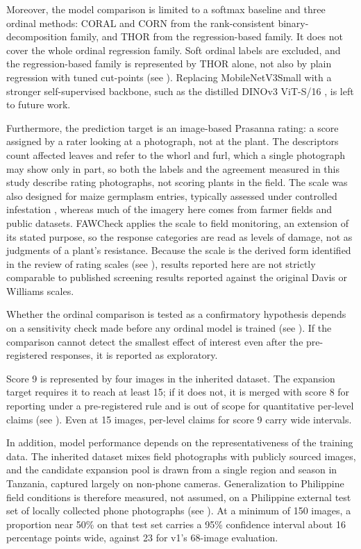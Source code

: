 \documentclass{icsthesis}
\newcommand{\secref}[1]{\textit{\nameref{#1}}}
\begin{document}
\begin{mainmatter}
				Moreover, the model comparison is limited to a softmax baseline and three ordinal
				methods: CORAL and CORN from the rank-consistent binary-decomposition family, and
				THOR from the regression-based family. It does not cover the whole ordinal
				regression family. Soft ordinal labels are excluded, and the regression-based family
				is represented by THOR alone, not also by plain regression with tuned cut-points
				(see \secref{sec:whythor}). Replacing MobileNetV3Small with a stronger self-supervised backbone, such as the distilled DINOv3 ViT-S/16 \citep{simeoni2025}, is left to future work.

				Furthermore, the prediction target is an image-based Prasanna rating: a score
				assigned by a rater looking at a photograph, not at the plant. The descriptors count
				affected leaves and refer to the whorl and furl, which a single photograph may show
				only in part, so both the labels and the agreement measured in this study describe
				rating photographs, not scoring plants in the field. The scale was also designed for
				maize germplasm entries, typically assessed under controlled infestation
				\citep{prasanna2018,davis1992}, whereas much of the imagery here comes from farmer
				fields and public datasets. FAWCheck applies the scale to field monitoring, an
				extension of its stated purpose, so the response categories are read as levels of
				damage, not as judgments of a plant's resistance. Because the scale is the derived
				form identified in the review of rating scales (see \secref{sec:scales}), results
				reported here are not strictly comparable to published screening results reported
				against the original Davis or Williams scales.

				Whether the ordinal comparison is tested as a confirmatory hypothesis depends on a
				sensitivity check made before any ordinal model is trained (see
				\secref{sec:sensitivity}). If the comparison cannot detect the smallest effect of
				interest even after the pre-registered responses, it is reported as exploratory.

				Score 9 is represented by four images in the inherited dataset. The expansion target
				requires it to reach at least 15; if it does not, it is merged with score 8 for
				reporting under a pre-registered rule and is out of scope for quantitative per-level
				claims (see \secref{sec:merge}). Even at 15 images, per-level claims for score 9
				carry wide intervals.

				In addition, model performance depends on the representativeness of the training
				data. The inherited dataset mixes field photographs with publicly sourced images,
				and the candidate expansion pool is drawn from a single region and season in
				Tanzania, captured largely on non-phone cameras. Generalization to Philippine field
				conditions is therefore measured, not assumed, on a Philippine external test set of
				locally collected phone photographs (see \secref{sec:holdout}). At a minimum of 150
				images, a proportion near 50\% on that test set carries a 95\% confidence interval
				about 16 percentage points wide, against 23 for v1's 68-image evaluation.


\end{mainmatter}
\end{document}
